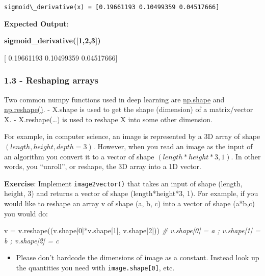 \documentclass[11pt]{article}
\providecommand{\tightlist}{%
      \setlength{\itemsep}{0pt}\setlength{\parskip}{0pt}}
\newenvironment{Shaded}{}{}
\newcommand{\DecValTok}[1]{\textcolor[rgb]{0.25,0.63,0.44}{{#1}}}
\newcommand{\CommentTok}[1]{\textcolor[rgb]{0.38,0.63,0.69}{\textit{{#1}}}}
\newcommand{\NormalTok}[1]{{#1}}
\newcommand{\OperatorTok}[1]{\textcolor[rgb]{0.40,0.40,0.40}{{#1}}}
\begin{document}
    \begin{Verbatim}[commandchars=\\\{\}]
sigmoid\_derivative(x) = [0.19661193 0.10499359 0.04517666]
    \end{Verbatim}

    \textbf{Expected Output}:

\textbf{sigmoid\_derivative({[}1,2,3{]})}

{[} 0.19661193 0.10499359 0.04517666{]}

    \hypertarget{reshaping-arrays}{%
\subsubsection{1.3 - Reshaping arrays}\label{reshaping-arrays}}

Two common numpy functions used in deep learning are
\href{https://docs.scipy.org/doc/numpy/reference/generated/numpy.ndarray.shape.html}{np.shape}
and
\href{https://docs.scipy.org/doc/numpy/reference/generated/numpy.reshape.html}{np.reshape()}.
- X.shape is used to get the shape (dimension) of a matrix/vector X. -
X.reshape(\ldots{}) is used to reshape X into some other dimension.

For example, in computer science, an image is represented by a 3D array
of shape \((length, height, depth = 3)\). However, when you read an
image as the input of an algorithm you convert it to a vector of shape
\((length*height*3, 1)\). In other words, you ``unroll'', or reshape,
the 3D array into a 1D vector.

\textbf{Exercise}: Implement \texttt{image2vector()} that takes an input
of shape (length, height, 3) and returns a vector of shape
(length*height*3, 1). For example, if you would like to reshape an array
v of shape (a, b, c) into a vector of shape (a*b,c) you would do:

\begin{Shaded}
\begin{Highlighting}[]
\NormalTok{v }\OperatorTok{=}\NormalTok{ v.reshape((v.shape[}\DecValTok{0}\NormalTok{]}\OperatorTok{*}\NormalTok{v.shape[}\DecValTok{1}\NormalTok{], v.shape[}\DecValTok{2}\NormalTok{])) }\CommentTok{# v.shape[0] = a ; v.shape[1] = b ; v.shape[2] = c}
\end{Highlighting}
\end{Shaded}

\begin{itemize}
\tightlist
\item
  Please don't hardcode the dimensions of image as a constant. Instead
  look up the quantities you need with \texttt{image.shape{[}0{]}}, etc.
\end{itemize}
\end{document}
